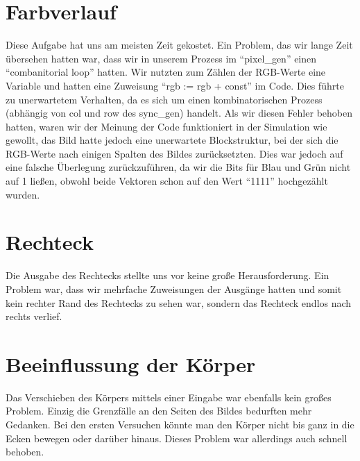\documentclass[parskip=full]{scrartcl}
\begin{document}
	\section{Farbverlauf}
		Diese Aufgabe hat uns am meisten Zeit gekostet. Ein Problem, das wir lange Zeit übersehen hatten war, dass wir in unserem Prozess im \enquote{pixel\_gen}  einen \enquote{combanitorial loop} hatten. Wir nutzten zum Zählen der RGB-Werte eine Variable und hatten eine Zuweisung \enquote{rgb := rgb + const} im Code. Dies führte zu unerwartetem Verhalten, da es sich um einen kombinatorischen Prozess (abhängig von col und row des sync\_gen) handelt.
		Als wir diesen Fehler behoben hatten, waren wir der Meinung der Code funktioniert in der Simulation wie gewollt, das Bild hatte jedoch eine unerwartete Blockstruktur, bei der sich die RGB-Werte nach einigen Spalten des Bildes zurücksetzten. Dies war jedoch auf eine falsche Überlegung zurückzuführen, da wir die Bits für Blau und Grün nicht auf 1 ließen, obwohl beide Vektoren schon auf den Wert \enquote{1111} hochgezählt wurden.
	\section{Rechteck}
		Die Ausgabe des Rechtecks stellte uns vor keine große Herausforderung. Ein Problem war, dass wir mehrfache Zuweisungen der Ausgänge hatten und somit kein rechter Rand des Rechtecks zu sehen war, sondern das Rechteck endlos nach rechts verlief.
	
	\section{Beeinflussung der Körper}
		Das Verschieben des Körpers mittels einer Eingabe war ebenfalls kein großes Problem. Einzig die Grenzfälle an den Seiten des Bildes bedurften mehr Gedanken. Bei den ersten Versuchen könnte man den Körper nicht bis ganz in die Ecken bewegen oder darüber hinaus. Dieses Problem war allerdings auch schnell behoben.
	
\end{document}
